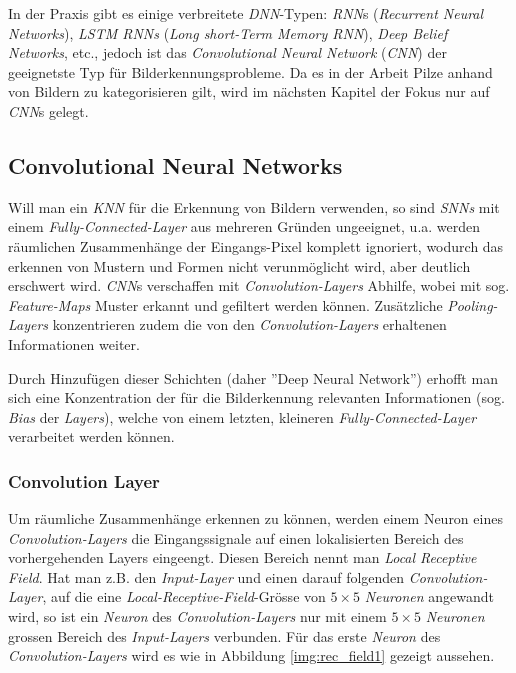 In der Praxis gibt es einige verbreitete \textit{DNN}-Typen: \textit{RNN}s (\textit{Recurrent Neural Networks}), \textit{LSTM RNNs} (\textit{Long short-Term Memory RNN}), \textit{Deep Belief Networks}, etc., jedoch ist das \textit{Convolutional Neural Network} (\textit{CNN}) der geeignetste Typ für Bilderkennungsprobleme. Da es in der Arbeit Pilze anhand von Bildern zu kategorisieren gilt, wird im nächsten Kapitel der Fokus nur auf \textit{CNN}s gelegt.

\subsection{Convolutional Neural Networks}\label{cha:theo:cnn}
Will man ein \textit{KNN} für die Erkennung von Bildern verwenden, so sind \textit{SNNs} mit einem \textit{Fully-Connected-Layer} aus mehreren Gründen ungeeignet, u.a. werden räumlichen Zusammenhänge der Eingangs-Pixel komplett ignoriert, wodurch das erkennen von Mustern und Formen nicht verunmöglicht wird, aber deutlich erschwert wird. \textit{CNN}s verschaffen mit \textit{Convolution-Layers} Abhilfe, wobei mit sog. \textit{Feature-Maps} Muster erkannt und gefiltert werden können. Zusätzliche \textit{Pooling-Layers} konzentrieren zudem die von den \textit{Convolution-Layers} erhaltenen Informationen weiter.

Durch Hinzufügen dieser Schichten (daher ''Deep Neural Network'') erhofft man sich eine Konzentration der für die Bilderkennung relevanten Informationen (sog. \textit{Bias} der \textit{Layers}), welche von einem letzten, kleineren \textit{Fully-Connected-Layer} verarbeitet werden können.

\subsubsection{Convolution Layer}
Um räumliche Zusammenhänge erkennen zu können, werden einem Neuron eines \textit{Convolution-Layers} die Eingangssignale auf einen lokalisierten Bereich des vorhergehenden Layers eingeengt. Diesen Bereich nennt man \textit{Local Receptive Field}. Hat man z.B. den \textit{Input-Layer} und einen darauf folgenden \textit{Convolution-Layer}, auf die eine \textit{Local-Receptive-Field}-Grösse von $5\times 5$ \textit{Neuronen} angewandt wird, so ist ein \textit{Neuron} des \textit{Convolution-Layers} nur mit einem $5\times 5$ \textit{Neuronen} grossen Bereich des \textit{Input-Layers} verbunden. Für das erste \textit{Neuron} des \textit{Convolution-Layers} wird es wie in Abbildung \ref{img:rec_field1} gezeigt aussehen.

